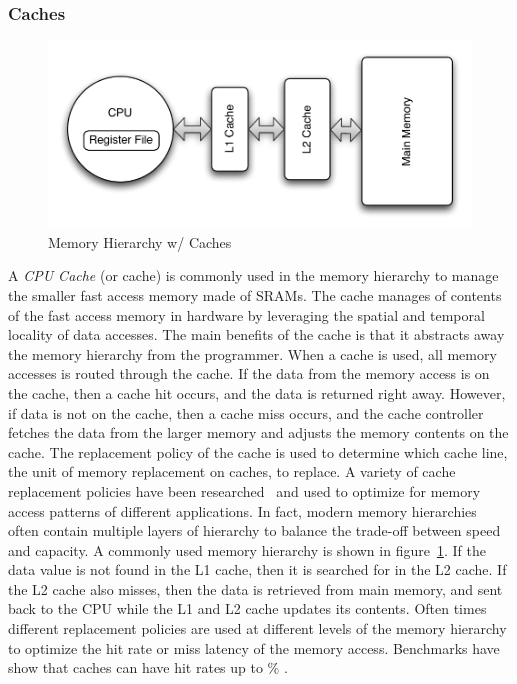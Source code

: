 \subsubsection{Caches}
\begin{figure}
  \vspace{-20pt}
  \begin{center}
    \includegraphics[scale=.5]{figs/conventional_mem_hierarchy}
  \end{center}
  \vspace{-20pt}
  \caption{Memory Hierarchy w/ Caches}
  \label{fig:conventional_mem_hierarchy}
  \vspace{-10pt}
\end{figure}   
A \emph{CPU Cache} (or cache) is commonly used in the memory hierarchy to manage the smaller fast access memory made of SRAMs.
The cache manages of contents of the fast access memory in hardware by leveraging the spatial and temporal locality of data accesses. 
The main benefits of the cache is that it abstracts away the memory hierarchy from the programmer.
When a cache is used, all memory accesses is routed through the cache. 
If the data from the memory access is on the cache, then a cache hit occurs, and the data is returned right away.
However, if data is not on the cache, then a cache miss occurs, and the cache controller fetches the data from the larger memory and adjusts the memory contents on the cache. 
The replacement policy of the cache is used to determine which cache line, the unit of memory replacement on caches, to replace. 
A variety of cache replacement policies have been researched~ and used to optimize for memory access patterns of different applications. 
In fact, modern memory hierarchies often contain multiple layers of hierarchy to balance the trade-off between speed and capacity.
A commonly used memory hierarchy is shown in figure~\ref{fig:conventional_mem_hierarchy}.
If the data value is not found in the L1 cache, then it is searched for in the L2 cache. 
If the L2 cache also misses, then the data is retrieved from main memory, and sent back to the CPU while the L1 and L2 cache updates its contents.
Often times different replacement policies are used at different levels of the memory hierarchy to optimize the hit rate or miss latency of the memory access.
Benchmarks have show that caches can have hit rates up to \% . 

